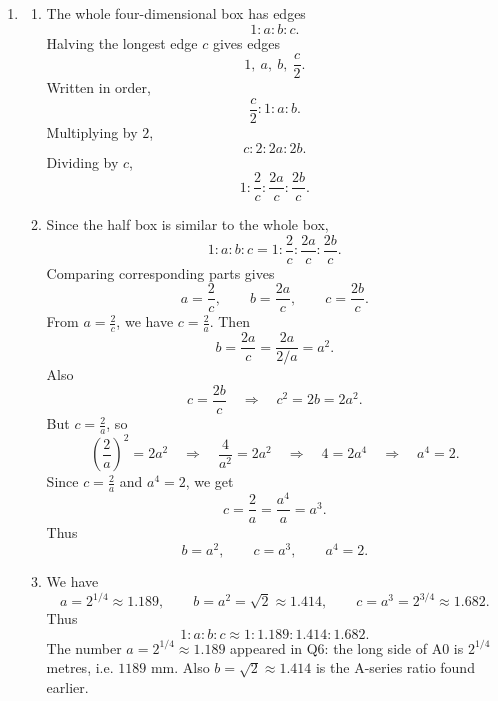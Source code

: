 \documentclass[11pt,a4paper]{article}
\begin{document}
\begin{enumerate}[label=\textbf{Q\arabic*.}, leftmargin=*, itemsep=1.2em]
\begin{enumerate}[label=(\alph*)]
\item Let the shortest edge be \(a\). Then the edges are
\[
a,\quad a\sqrt[3]{2},\quad a\sqrt[3]{4}.
\]
The volume is
\[
a\cdot a\sqrt[3]{2}\cdot a\sqrt[3]{4}
=a^3\sqrt[3]{8}
=2a^3.
\]
Since the volume is \(1000\text{ cm}^3\),
\[
2a^3=1000
\quad\Longrightarrow\quad
a^3=500
\quad\Longrightarrow\quad
a=\sqrt[3]{500}\approx 7.94\text{ cm}.
\]
The middle edge is
\[
a\sqrt[3]{2}
=\sqrt[3]{500\cdot 2}
=\sqrt[3]{1000}
=10\text{ cm}.
\]
The longest edge is
\[
a\sqrt[3]{4}
=\sqrt[3]{500\cdot4}
=\sqrt[3]{2000}
\approx 12.60\text{ cm}.
\]
\end{enumerate}

\item
\begin{enumerate}[label=(\alph*)]
\item The whole four-dimensional box has edges
\[
1:a:b:c.
\]
Halving the longest edge \(c\) gives edges
\[
1,\ a,\ b,\ \frac c2.
\]
Written in order,
\[
\frac c2:1:a:b.
\]
Multiplying by \(2\),
\[
c:2:2a:2b.
\]
Dividing by \(c\),
\[
1:\frac2c:\frac{2a}{c}:\frac{2b}{c}.
\]

\item Since the half box is similar to the whole box,
\[
1:a:b:c
=
1:\frac2c:\frac{2a}{c}:\frac{2b}{c}.
\]
Comparing corresponding parts gives
\[
a=\frac2c,
\qquad
b=\frac{2a}{c},
\qquad
c=\frac{2b}{c}.
\]
From \(a=\frac2c\), we have \(c=\frac2a\). Then
\[
b=\frac{2a}{c}
=\frac{2a}{2/a}
=a^2.
\]
Also
\[
c=\frac{2b}{c}
\quad\Longrightarrow\quad
c^2=2b=2a^2.
\]
But \(c=\frac2a\), so
\[
\left(\frac2a\right)^2=2a^2
\quad\Longrightarrow\quad
\frac4{a^2}=2a^2
\quad\Longrightarrow\quad
4=2a^4
\quad\Longrightarrow\quad
a^4=2.
\]
Since \(c=\frac2a\) and \(a^4=2\), we get
\[
c=\frac{2}{a}=\frac{a^4}{a}=a^3.
\]
Thus
\[
b=a^2,
\qquad
c=a^3,
\qquad
a^4=2.
\]

\item We have
\[
a=2^{1/4}\approx 1.189,
\qquad
b=a^2=\sqrt2\approx 1.414,
\qquad
c=a^3=2^{3/4}\approx 1.682.
\]
Thus
\[
1:a:b:c
\approx 1:1.189:1.414:1.682.
\]
The number \(a=2^{1/4}\approx 1.189\) appeared in Q6: the long side of A0 is \(2^{1/4}\) metres, i.e. \(1189\text{ mm}\). Also \(b=\sqrt2\approx 1.414\) is the A-series ratio found earlier.
\end{enumerate}


\end{enumerate}
\end{document}
